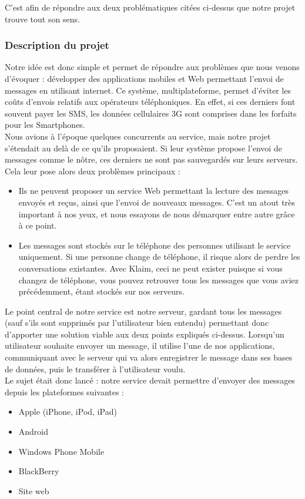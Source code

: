 \documentclass{article}
\begin{document}
	C’est afin de répondre aux deux problématiques citées ci-dessus que notre projet trouve tout son sens.

\subsubsection{Description du projet}
	Notre idée est donc simple et permet de répondre aux problèmes que nous venons d'évoquer : développer des applications mobiles et Web permettant l’envoi de messages en utilisant internet. Ce système, multiplateforme, permet d’éviter les coûts d’envois relatifs aux opérateurs téléphoniques. En effet, si ces derniers font souvent payer les SMS, les données cellulaires 3G sont comprises dans les forfaits pour les Smartphones.\\
	
	Nous avions à l’époque quelques concurrents au service, mais notre projet s’étendait au delà de ce qu’ils proposaient. Si leur système propose l’envoi de messages comme le nôtre, ces derniers ne sont pas sauvegardés sur leurs serveurs. Cela leur pose alors deux problèmes principaux :
	\begin{itemize}
		\item Ils ne peuvent proposer un service Web permettant la lecture des messages envoyés et reçus, ainsi que l’envoi de nouveaux messages. C'est un atout très important à nos yeux, et nous essayons de nous démarquer entre autre grâce à ce point.
		\item Les messages sont stockés sur le téléphone des personnes utilisant le service uniquement. Si une personne change de téléphone, il risque alors de perdre les conversations existantes. Avec Klaim, ceci ne peut exister puisque si vous changez de téléphone, vous pouvez retrouver tous les messages que vous aviez précédemment, étant stockés sur nos serveurs.\\
	\end{itemize}

Le point central de notre service est notre serveur, gardant tous les messages (sauf s’ils sont supprimés par l’utilisateur bien entendu) permettant donc d’apporter une solution viable aux deux points expliqués ci-dessus. Lorsqu'un utilisateur souhaite envoyer un message, il utilise l'une de nos applications, communiquant avec le serveur qui va alors enregistrer le message dans ses bases de données, puis le transférer à l'utilisateur voulu. \\
	
Le sujet était donc lancé : notre service devait permettre d’envoyer des messages depuis les plateformes suivantes :
	\begin{itemize}
		\item Apple (iPhone, iPod, iPad)
		\item Android
		\item Windows Phone Mobile
		\item BlackBerry
		\item Site web\\
	\end{itemize}
	
\end{document}
